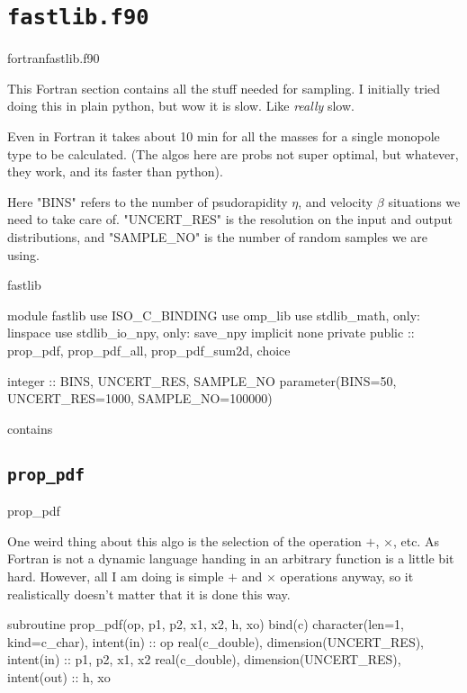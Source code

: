 \documentclass[10pt, a4paper]{article}
\begin{document}
\section{\texttt{fastlib.f90}}
\label{sec:fastlib}
\begin{subfile}{fortran}{fastlib.f90}

This Fortran section contains all the stuff needed for sampling. I initially tried doing this in plain python, but wow it is slow. Like \emph{really} slow. 

Even in Fortran it takes about 10 min for all the masses for a single monopole type to be calculated. (The algos here are probs not super optimal, but whatever, they work, and its faster than python).

Here "BINS" refers to the number of psudorapidity $\eta$, and velocity $\beta$ situations we need to take care of. 
"UNCERT_RES" is the resolution on the input and output distributions, and "SAMPLE_NO" is the number of random samples we are using. 

\begin{codeblock}[noref]{fastlib}
\begin{code}
module fastlib
	use ISO_C_BINDING
	use omp_lib
	use stdlib_math, only: linspace
	use stdlib_io_npy, only: save_npy
	implicit none
	private
	public :: prop_pdf, prop_pdf_all, prop_pdf_sum2d, choice
	
	integer :: BINS, UNCERT_RES, SAMPLE_NO
	parameter(BINS=50, UNCERT_RES=1000, SAMPLE_NO=100000)
	
contains 
\end{code}

\subsection{\texttt{prop\_pdf}}
\begin{codeblock}{prop_pdf}

One weird thing about this algo is the selection of the operation $+$, $\times$, etc.
As Fortran is not a dynamic language handing in an arbitrary function is a little bit hard. 
However, all I am doing is simple $+$ and $\times$ operations anyway, so it realistically doesn't matter that it is done this way. 

\begin{code}
subroutine prop_pdf(op, p1, p2, x1, x2, h, xo) bind(c)
	character(len=1, kind=c_char), intent(in) :: op 
	real(c_double), dimension(UNCERT_RES), intent(in)  :: p1, p2, x1, x2
	real(c_double), dimension(UNCERT_RES), intent(out) :: h, xo
	

\end{code}
\end{codeblock}
\end{codeblock}
\end{subfile}
\end{document}
